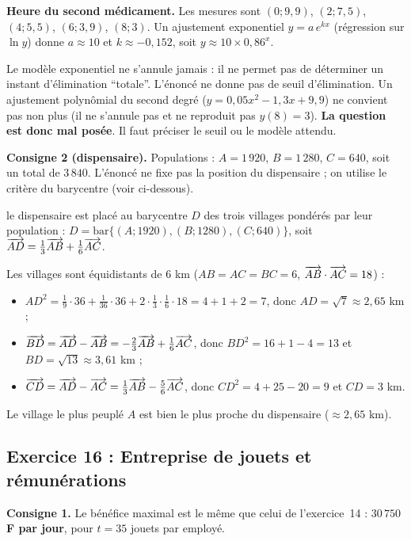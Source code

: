 \medskip\noindent\textbf{Heure du second m\'edicament.} Les mesures sont $(0;9{,}9)$, $(2;7{,}5)$, $(4;5{,}5)$, $(6;3{,}9)$, $(8;3)$.
Un ajustement exponentiel $y=a\,e^{kx}$ (r\'egression sur $\ln y$) donne $a\approx10$ et $k\approx-0{,}152$, soit $y\approx10\times0{,}86^x$.
\begin{rem} Le mod\`ele exponentiel ne s'annule jamais : il ne permet pas de d\'eterminer un instant d'\'elimination ``totale''.
L'\'enonc\'e ne donne pas de seuil d'\'elimination. Un ajustement polyn\^omial du second degr\'e
($y=0{,}05x^2-1{,}3x+9{,}9$) ne convient pas non plus (il ne s'annule pas et ne reproduit pas $y(8)=3$).
\textbf{La question est donc mal pos\'ee}. Il faut pr\'eciser le seuil ou le mod\`ele attendu.
\end{rem}

\medskip\noindent\textbf{Consigne 2 (dispensaire).} Populations : $A=1\,920$, $B=1\,280$, $C=640$, soit un total de $3\,840$.
L'\'enonc\'e ne fixe pas la position du dispensaire ; on utilise le crit\`ere du barycentre (voir ci-dessous).
\begin{hyp}le dispensaire est plac\'e au barycentre $D$ des trois villages pond\'er\'es par leur population :
$D=\mathrm{bar}\{(A;1920),(B;1280),(C;640)\}$, soit $\overrightarrow{AD}=\tfrac13\overrightarrow{AB}+\tfrac16\overrightarrow{AC}$.\end{hyp}
Les villages sont \'equidistants de $6$ km ($AB=AC=BC=6$, $\overrightarrow{AB}\cdot\overrightarrow{AC}=18$) :
\begin{itemize}
  \item $AD^2=\tfrac19\cdot36+\tfrac1{36}\cdot36+2\cdot\tfrac13\cdot\tfrac16\cdot18=4+1+2=7$, donc $AD=\sqrt7\approx2{,}65$ km ;
  \item $\overrightarrow{BD}=\overrightarrow{AD}-\overrightarrow{AB}=-\tfrac23\overrightarrow{AB}+\tfrac16\overrightarrow{AC}$, donc $BD^2=16+1-4=13$ et $BD=\sqrt{13}\approx3{,}61$ km ;
  \item $\overrightarrow{CD}=\overrightarrow{AD}-\overrightarrow{AC}=\tfrac13\overrightarrow{AB}-\tfrac56\overrightarrow{AC}$, donc $CD^2=4+25-20=9$ et $CD=3$ km.
\end{itemize}
Le village le plus peupl\'e $A$ est bien le plus proche du dispensaire ($\approx2{,}65$ km).

\subsection{Exercice 16 : Entreprise de jouets et r\'emun\'erations}

\textbf{Consigne 1.} Le b\'en\'efice maximal est le m\^eme que celui de l'exercice~14 : \textbf{$30\,750$ F par jour}, pour $t=35$ jouets par employ\'e.

